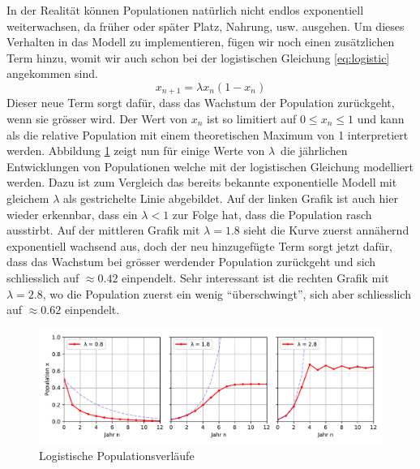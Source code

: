 In der Realität können Populationen natürlich nicht endlos
exponentiell weiterwachsen, 
da früher oder später Platz, Nahrung, usw. ausgehen.
Um dieses Verhalten in das Modell zu implementieren,
fügen wir noch einen zusätzlichen Term hinzu, 
womit wir auch schon bei der logistischen Gleichung 
\eqref{eq:logistic}
angekommen sind.
\begin{equation}
    \label{eq:logistic}
    x_{n+1} = \lambda x_{n} (1 - x_{n})
\end{equation}
Dieser neue Term sorgt dafür, 
dass das Wachstum der Population zurückgeht, 
wenn sie grösser wird.
Der Wert von $x_n$ ist so limitiert auf 
$0 \le x_n \le 1$  
und kann als die relative Population mit einem
theoretischen Maximum von 1 interpretiert werden. 
Abbildung \ref{fig:pop_logistic} zeigt nun
für einige Werte von $\lambda$\
die jährlichen Entwicklungen von Populationen 
welche mit der logistischen Gleichung modelliert werden.
Dazu ist zum Vergleich das bereits bekannte exponentielle Modell
mit gleichem $\lambda$ als gestrichelte Linie abgebildet. 
Auf der linken Grafik ist auch hier wieder erkennbar, 
dass ein $\lambda < 1$ zur Folge hat, 
dass die Population rasch ausstirbt. 
Auf der mittleren Grafik mit $\lambda = 1.8$ sieht 
die Kurve zuerst annähernd exponentiell wachsend aus,
doch der neu hinzugefügte Term sorgt jetzt dafür, 
dass das Wachstum bei grösser werdender Population zurückgeht 
und sich schliesslich auf $\approx 0.42$ einpendelt. 
Sehr interessant ist die rechten Grafik mit $\lambda = 2.8$,
wo die Population zuerst ein wenig ``überschwingt'', 
sich aber schliesslich auf $\approx 0.62$ einpendelt.  
\begin{figure}
    \includegraphics[width=\linewidth]{papers/logistic/figures/pop_logistic.pdf}
    \caption{Logistische Populationsverläufe}
    \label{fig:pop_logistic}
\end{figure}